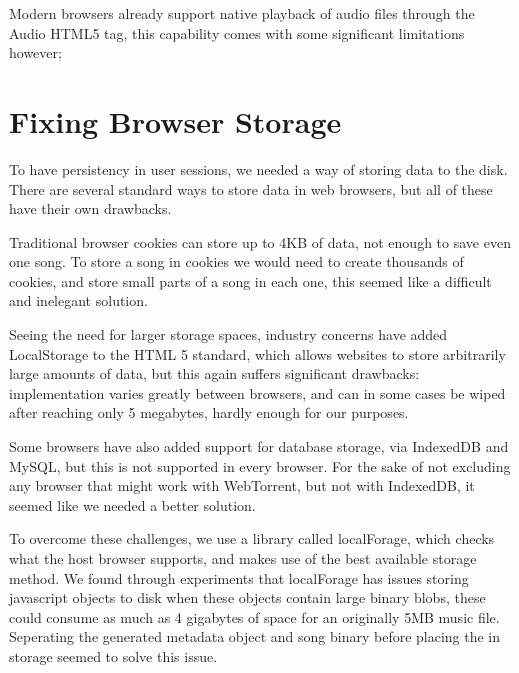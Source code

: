 


Modern browsers already support native playback of audio files through the Audio HTML5 tag, 
this capability comes with some significant limitations however; 
\newline



\section{Fixing Browser Storage}
To have persistency in user sessions, we needed a way of storing data to the disk. There are several standard ways to store data in web browsers, but all of these have their own drawbacks.

Traditional browser cookies can store up to 4KB of data, 
not enough to save even one song. 
To store a song in cookies we would need to create thousands of cookies, 
and store small parts of a song in each one, 
this seemed like a difficult and inelegant solution.

Seeing the need for larger storage spaces, 
industry concerns have added LocalStorage to the HTML 5 standard,
which allows websites to store arbitrarily large amounts of data,
but this again suffers significant drawbacks: 
implementation varies greatly between browsers, 
and can in some cases be wiped after reaching only 5 megabytes, 
hardly enough for our purposes.

Some browsers have also added support for database storage, via IndexedDB and MySQL, 
but this is not supported in every browser. 
For the sake of not excluding any browser that might work with WebTorrent, but not with IndexedDB,
it seemed like we needed a better solution.
\newline

To overcome these challenges, we use a library called localForage, 
which checks what the host browser supports,
and makes use of the best available storage method.
We found through experiments
that localForage has issues storing javascript objects to disk when these objects contain large binary blobs, 
these could consume as much as 4 gigabytes of space for an originally 5MB music file.
Seperating the generated metadata object and song binary before placing the in storage
seemed to solve this issue.
\newline

